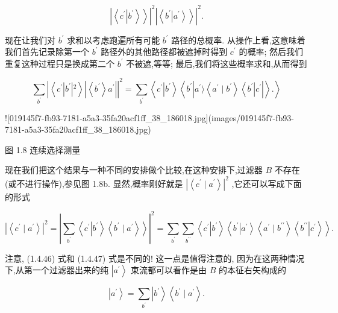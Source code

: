 \documentclass[lang=cn,newtx,10pt,scheme=chinese,thmcnt=section]{elegantbook}
\begin{document}
$$
{\left| \left\langle {c}^{\prime }\left| {b}^{\prime }\right\rangle \right\rangle \right| }^{2}{\left| \left\langle {b}^{\prime }\left| {a}^{\prime }\right\rangle \right\rangle \right| }^{2}. \tag{1.4.45}
$$

现在让我们对 ${b}^{\prime }$ 求和以考虑跑遍所有可能 ${b}^{\prime }$ 路径的总概率. 从操作上看,这意味着我们首先记录除第一个 ${b}^{\prime }$ 路径外的其他路径都被遮掉时得到 ${c}^{\prime }$ 的概率; 然后我们重复这种过程只是换成第二个 ${b}^{\prime }$ 不被遮,等等; 最后,我们将这些概率求和,从而得到

$$
\mathop{\sum }\limits_{{b}^{\prime }}{\left| \left\langle {c}^{\prime }\left| {b}^{\prime }\right| {}^{2}\right\rangle \left| \left\langle {b}^{\prime }\right\rangle {a}^{\prime }\right| \right| }^{2} = \mathop{\sum }\limits_{{b}^{\prime }}\left\langle {{c}^{\prime }\left| {b}^{\prime }\right\rangle \left\langle {{b}^{\prime }\left| {{a}^{\prime }\rangle \left\langle {{a}^{\prime } \mid {b}^{\prime }}\right\rangle \left\langle {b}^{\prime }\right| {c}^{\prime }}\right| }\right\rangle .}\right\rangle \tag{1.4.46}
$$

![019145f7-fb93-7181-a5a3-35fa20acf1ff_38_186018.jpg](images/019145f7-fb93-7181-a5a3-35fa20acf1ff_38_186018.jpg)

图 1.8 连续选择测量

现在我们把这个结果与一种不同的安排做个比较,在这种安排下,过滤器 $B$ 不存在 (或不进行操作),参见图 1.8b. 显然,概率刚好就是 ${\left| \left\langle {c}^{\prime } \mid {a}^{\prime }\right\rangle \right| }^{2}$ ,它还可以写成下面的形式

$$
{\left| \left\langle {c}^{\prime } \mid {a}^{\prime }\right\rangle \right| }^{2} = {\left| \mathop{\sum }\limits_{{b}^{\prime }}\left\langle {c}^{\prime }\left| {b}^{\prime }\right\rangle \left\langle {b}^{\prime } \mid {a}^{\prime }\right\rangle \right\rangle \right| }^{2} = \mathop{\sum }\limits_{{b}^{\prime }}\mathop{\sum }\limits_{{b}^{\prime \prime }}\left\langle {{c}^{\prime }\left| {b}^{\prime }\right\rangle \left\langle {{b}^{\prime }\left| {a}^{\prime }\right\rangle \left\langle {{a}^{\prime } \mid {b}^{\prime \prime }}\right\rangle \left\langle {b}^{\prime \prime }\right| {c}^{\prime }}\right\rangle }\right\rangle . \tag{1.4.47}
$$

注意, (1.4.46) 式和 (1.4.47) 式是不同的! 这一点是值得注意的, 因为在这两种情况下,从第一个过滤器出来的纯 $\left| {a}^{\prime }\right\rangle$ 束流都可以看作是由 $B$ 的本征右矢构成的

$$
\left| {a}^{\prime }\right\rangle = \mathop{\sum }\limits_{{b}^{\prime }}\left| {b}^{\prime }\right\rangle \left\langle {{b}^{\prime } \mid {a}^{\prime }}\right\rangle . \tag{1.4.48}
$$
\end{document}
